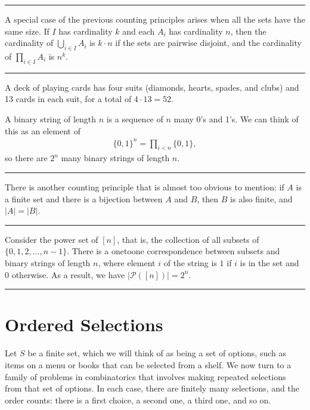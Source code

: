 \documentclass[letterpaper,10pt,english]{sphinxmanual}
\begin{document}
\bigskip\hrule\bigskip


\sphinxAtStartPar
A special case of the previous counting principles arises when all the sets have the same size. If \(I\) has cardinality \(k\) and each \(A_i\) has cardinality \(n\), then the cardinality of \(\bigcup_{i \in I} A_i\) is \(k \cdot n\) if the sets are pairwise disjoint, and the cardinality of \(\prod_{i \in I} A_i\) is \(n^k\).


\bigskip\hrule\bigskip


\sphinxAtStartPar
{} A deck of playing cards has four suits (diamonds, hearts, spades, and clubs) and 13 cards in each suit, for a total of \(4 \cdot 13 = 52\).

\sphinxAtStartPar
{} A binary string of length \(n\) is a sequence of \(n\) many 0’s and 1’s. We can think of this as an element of
\begin{equation*}
\begin{split}\{0, 1\}^n = \prod_{i < n} \{0, 1\},\end{split}
\end{equation*}
\sphinxAtStartPar
so there are \(2^n\) many binary strings of length \(n\).


\bigskip\hrule\bigskip


\sphinxAtStartPar
There is another counting principle that is almost too obvious to mention: if \(A\) is a finite set and there is a bijection between \(A\) and \(B\), then \(B\) is also finite, and \(|A| = |B|\).


\bigskip\hrule\bigskip


\sphinxAtStartPar
{} Consider the power set of \([n]\), that is, the collection of all subsets of \(\{0, 1, 2, \ldots, n-1\}\). There is a one\sphinxhyphen{}to\sphinxhyphen{}one correspondence between subsets and binary strings of length \(n\), where element \(i\) of the string is \(1\) if \(i\) is in the set and \(0\) otherwise. As a result, we have \(| \mathcal P ([n]) | = 2^n\).


\bigskip\hrule\bigskip



\section{Ordered Selections}
\label{\detokenize{combinatorics:ordered-selections}}
\sphinxAtStartPar
Let \(S\) be a finite set, which we will think of as being a set of options, such as items on a menu or books that can be selected from a shelf. We now turn to a family of problems in combinatorics that involves making repeated selections from that set of options. In each case, there are finitely many selections, and the order counts: there is a first choice, a second one, a third one, and so on.
\end{document}
